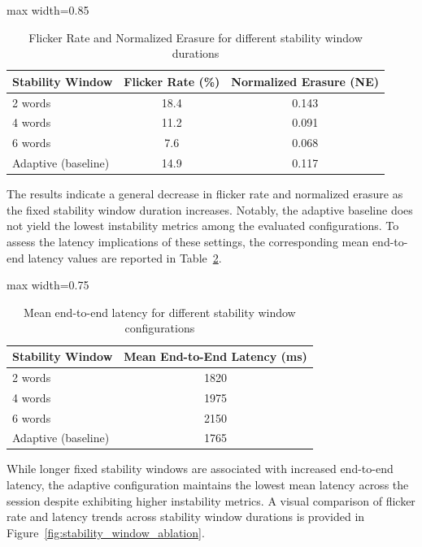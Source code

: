 \begin{table}[!htbp]
\centering
\caption[Stability metrics under varying stability windows]{Flicker Rate and Normalized Erasure for different stability window durations}
\label{tab:stability_window_flicker_ne}
\begin{adjustbox}{max width=0.85\textwidth}
\begin{tabular}{lcc}
\toprule
\textbf{Stability Window} & \textbf{Flicker Rate (\%)} & \textbf{Normalized Erasure (NE)} \\
\midrule
2 words & 18.4 & 0.143 \\
4 words & 11.2 & 0.091 \\
6 words & 7.6 & 0.068 \\
Adaptive (baseline) & 14.9 & 0.117 \\
\bottomrule
\end{tabular}
\end{adjustbox}
\end{table}

The results indicate a general decrease in flicker rate and normalized erasure as the fixed stability window duration increases. Notably, the adaptive baseline does not yield the lowest instability metrics among the evaluated configurations. To assess the latency implications of these settings, the corresponding mean end-to-end latency values are reported in Table~\ref{tab:stability_window_latency}.

\begin{table}[!htbp]
\centering
\caption[Latency impact of stability window duration]{Mean end-to-end latency for different stability window configurations}
\label{tab:stability_window_latency}
\begin{adjustbox}{max width=0.75\textwidth}
\begin{tabular}{lc}
\toprule
\textbf{Stability Window} & \textbf{Mean End-to-End Latency (ms)} \\
\midrule
2 words & 1820 \\
4 words & 1975 \\
6 words & 2150 \\
Adaptive (baseline) & 1765 \\
\bottomrule
\end{tabular}
\end{adjustbox}
\end{table}

While longer fixed stability windows are associated with increased end-to-end latency, the adaptive configuration maintains the lowest mean latency across the session despite exhibiting higher instability metrics. A visual comparison of flicker rate and latency trends across stability window durations is provided in Figure~\ref{fig:stability_window_ablation}.

